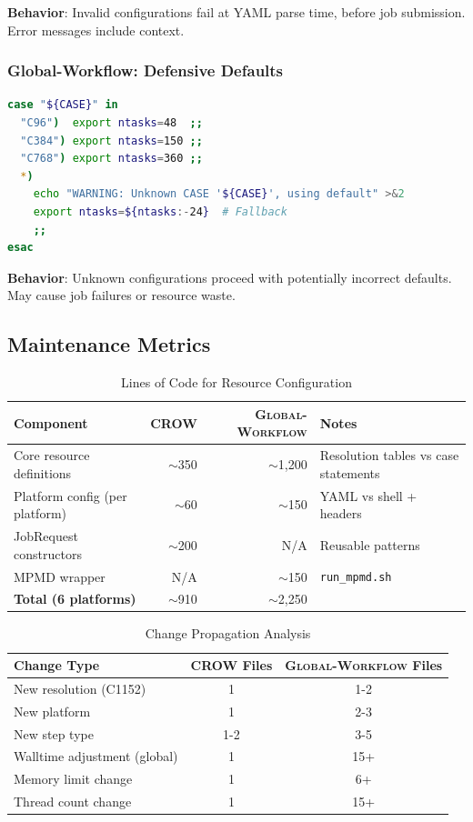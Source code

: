 \documentclass[11pt,twoside]{article}
\newcommand{\crow}{\textsc{CROW}}
\newcommand{\gw}{\textsc{Global-Workflow}}
\begin{document}
\textbf{Behavior}: Invalid configurations fail at YAML parse time, before job submission. Error messages include context.

\subsubsection{Global-Workflow: Defensive Defaults}

\begin{lstlisting}[language=Bash, caption={\gw{} Default Handling}]
case "${CASE}" in
  "C96")  export ntasks=48  ;;
  "C384") export ntasks=150 ;;
  "C768") export ntasks=360 ;;
  *)
    echo "WARNING: Unknown CASE '${CASE}', using default" >&2
    export ntasks=${ntasks:-24}  # Fallback
    ;;
esac
\end{lstlisting}

\textbf{Behavior}: Unknown configurations proceed with potentially incorrect defaults. May cause job failures or resource waste.

\subsection{Maintenance Metrics}

\begin{table}[H]
\centering
\caption{Lines of Code for Resource Configuration}
\label{tab:loc}
\begin{tabular}{@{}lrrl@{}}
\toprule
\textbf{Component} & \textbf{\crow{}} & \textbf{\gw{}} & \textbf{Notes} \\
\midrule
Core resource definitions & $\sim$350 & $\sim$1,200 & Resolution tables vs case statements \\
Platform config (per platform) & $\sim$60 & $\sim$150 & YAML vs shell + headers \\
JobRequest constructors & $\sim$200 & N/A & Reusable patterns \\
MPMD wrapper & N/A & $\sim$150 & \texttt{run\_mpmd.sh} \\
\midrule
\textbf{Total (6 platforms)} & $\sim$910 & $\sim$2,250 & \\
\bottomrule
\end{tabular}
\end{table}

\begin{table}[H]
\centering
\caption{Change Propagation Analysis}
\label{tab:propagation}
\begin{tabular}{@{}p{4cm}cc@{}}
\toprule
\textbf{Change Type} & \textbf{\crow{} Files} & \textbf{\gw{} Files} \\
\midrule
New resolution (C1152) & 1 & 1-2 \\
New platform & 1 & 2-3 \\
New step type & 1-2 & 3-5 \\
Walltime adjustment (global) & 1 & 15+ \\
Memory limit change & 1 & 6+ \\
Thread count change & 1 & 15+ \\
\bottomrule
\end{tabular}
\end{table}
\end{document}
